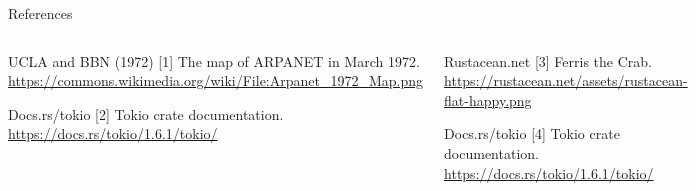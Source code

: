 \begin{frame}{References}
    \begin{columns}[c]


        \footnotesize {
            \begin{thebibliography}{9}

                 UCLA and BBN (1972) [1]
                \newblock The map of ARPANET in March 1972.
                \newblock \url{https://commons.wikimedia.org/wiki/File:Arpanet_1972_Map.png}

                 Docs.rs/tokio [2]
                \newblock Tokio crate documentation.
                \newblock \url{https://docs.rs/tokio/1.6.1/tokio/}

            \end{thebibliography}
        }


        \footnotesize {
            \begin{thebibliography}{9}

                 Rustacean.net [3]
                \newblock Ferris the Crab.
                \newblock \url{https://rustacean.net/assets/rustacean-flat-happy.png}

                 Docs.rs/tokio [4]
                \newblock Tokio crate documentation.
                \newblock \url{https://docs.rs/tokio/1.6.1/tokio/}

            \end{thebibliography}
        }

    \end{columns}
\end{frame}
